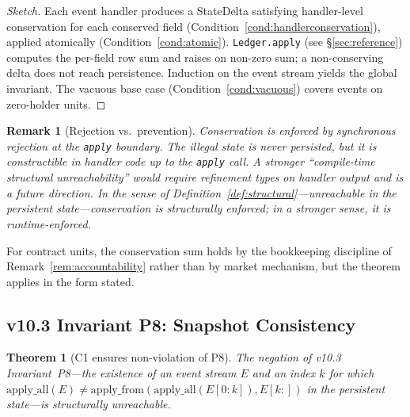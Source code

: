 \documentclass[11pt,a4paper]{article}
\newtheorem{theorem}[definition]{Theorem}
\newtheorem{remark}[definition]{Remark}
\begin{document}
\begin{proof}[Sketch]
Each event handler produces a StateDelta satisfying handler-level conservation for each conserved field (Condition~\ref{cond:handlerconservation}), applied atomically (Condition~\ref{cond:atomic}). \texttt{Ledger.apply} (see \S\ref{sec:reference}) computes the per-field row sum and raises on non-zero sum; a non-conserving delta does not reach persistence. Induction on the event stream yields the global invariant. The vacuous base case (Condition~\ref{cond:vacuous}) covers events on zero-holder units.
\end{proof}

\begin{remark}[Rejection vs.\ prevention]
\label{rem:rejection}
Conservation is enforced by synchronous rejection at the \texttt{apply} boundary. The illegal state is never persisted, but it is \emph{constructible} in handler code up to the \texttt{apply} call. A stronger ``compile-time structural unreachability'' would require refinement types on handler output and is a future direction. In the sense of Definition~\ref{def:structural}---unreachable in the persistent state---conservation is structurally enforced; in a stronger sense, it is runtime-enforced.
\end{remark}

For contract units, the conservation sum holds by the bookkeeping discipline of Remark~\ref{rem:accountability} rather than by market mechanism, but the theorem applies in the form stated.

\subsection{v10.3 Invariant P8: Snapshot Consistency}

\begin{theorem}[C1 ensures non-violation of P8]\label{thm:p8}
The negation of v10.3 Invariant~P8---the existence of an event stream $E$ and an index $k$ for which $\mathrm{apply\_all}(E) \neq \mathrm{apply\_from}(\mathrm{apply\_all}(E[0{:}k]), E[k{:}])$ in the persistent state---is structurally unreachable.
\end{theorem}
\end{document}
